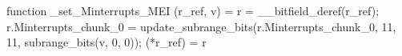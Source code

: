 function _set_Minterrupts_MEI (r_ref, v) = {
    r = __bitfield_deref(r_ref);
    r.Minterrupts_chunk_0 = update_subrange_bits(r.Minterrupts_chunk_0, 11, 11, subrange_bits(v, 0, 0));
    (*r_ref) = r
}
